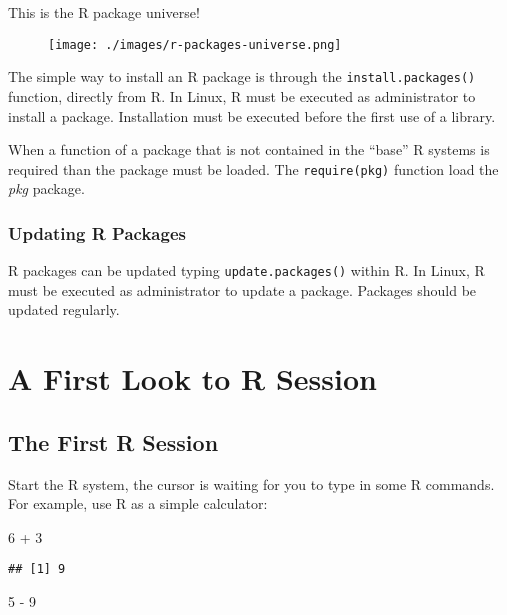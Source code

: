 \documentclass[]{book}
\newenvironment{Shaded}{\begin{snugshade}}{\end{snugshade}}
\newcommand{\DecValTok}[1]{\textcolor[rgb]{0.00,0.00,0.81}{{#1}}}
\newcommand{\StringTok}[1]{\textcolor[rgb]{0.31,0.60,0.02}{{#1}}}
\newcommand{\NormalTok}[1]{{#1}}
\begin{document}
This is the R package universe!

\begin{figure}[htbp]
\centering
\texttt{[image: ./images/r-packages-universe.png]}
\caption{}
\end{figure}

The simple way to install an R package is through the
\texttt{install.packages()} function, directly from R. In Linux, R must
be executed as administrator to install a package. Installation must be
executed before the first use of a library.

When a function of a package that is not contained in the ``base'' R
systems is required than the package must be loaded. The
\texttt{require(pkg)} function load the \emph{pkg} package.

\subsection{Updating R Packages}\label{updating-r-packages}

R packages can be updated typing \texttt{update.packages()} within R. In
Linux, R must be executed as administrator to update a package. Packages
should be updated regularly.

\chapter{A First Look to R Session}\label{a-first-look-to-r-session}

\section{The First R Session}\label{the-first-r-session}

Start the R system, the cursor is waiting for you to type in some R
commands. For example, use R as a simple calculator:

\begin{Shaded}
\begin{Highlighting}[]
\DecValTok{6} \NormalTok{+}\StringTok{ }\DecValTok{3}
\end{Highlighting}
\end{Shaded}

\begin{verbatim}
## [1] 9
\end{verbatim}

\begin{Shaded}
\begin{Highlighting}[]
\DecValTok{5} \NormalTok{-}\StringTok{ }\DecValTok{9}
\end{Highlighting}
\end{Shaded}
\end{document}
